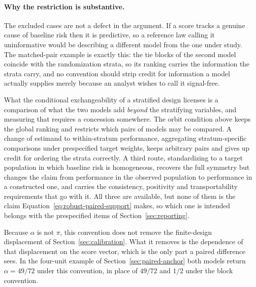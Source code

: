 \documentclass[11pt]{article}
\theoremstyle{remark}
\begin{document}
\paragraph{Why the restriction is substantive.}
The excluded cases are not a defect in the argument. If a score tracks a genuine cause of baseline risk then it is predictive, so a reference law calling it uninformative would be describing a different model from the one under study. The matched-pair example is exactly this: the tie blocks of the second model coincide with the randomization strata, so its ranking carries the information the strata carry, and no convention should strip credit for information a model actually supplies merely because an analyst wishes to call it signal-free.

What the conditional exchangeability of a stratified design licenses is a comparison of what the two models add \emph{beyond} the stratifying variables, and measuring that requires a concession somewhere. The orbit condition above keeps the global ranking and restricts which pairs of models may be compared. A change of estimand to within-stratum performance, aggregating stratum-specific comparisons under prespecified target weights, keeps arbitrary pairs and gives up credit for ordering the strata correctly. A third route, standardizing to a target population in which baseline risk is homogeneous, recovers the full symmetry but changes the claim from performance in the observed population to performance in a constructed one, and carries the consistency, positivity and transportability requirements that go with it. All three are available, but none of them is the claim Equation~\eqref{eq:robust-paired-support} makes, so which one is intended belongs with the prespecified items of Section~\ref{sec:reporting}.


Because $\alpha$ is not $\pi$, this convention does not remove the finite-design displacement of Section~\ref{sec:calibration}. What it removes is the dependence of that displacement on the score vector, which is the only part a paired difference sees. In the four-unit example of Section~\ref{sec:paired-anchor} both models return $\alpha=49/72$ under this convention, in place of $49/72$ and $1/2$ under the block convention.
\end{document}
